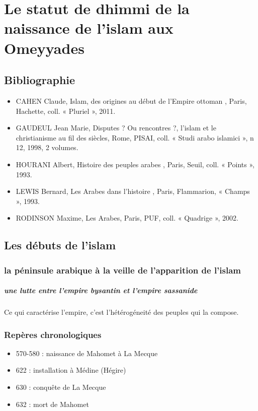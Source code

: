 \chapter{Le statut de dhimmi de la
naissance de l’islam aux Omeyyades}



\section{Bibliographie}

\begin{itemize}
    \item CAHEN Claude,
Islam, des origines au début de l’Empire ottoman , Paris, Hachette, coll. « Pluriel », 2011.
    \item 
GAUDEUL
Jean Marie, Disputes ? Ou rencontres ?, l’islam et le christianisme au fil des siècles, Rome,
PISAI, coll. « Studi arabo islamici », n 12, 1998, 2 volumes.
    \item 
HOURANI Albert,
Histoire des peuples arabes , Paris, Seuil, coll. « Points », 1993.
    \item 
LEWIS Bernard,
Les Arabes dans l’histoire , Paris, Flammarion, « Champs », 1993.
    \item 
RODINSON Maxime,
Les Arabes, Paris, PUF, coll. « Quadrige », 2002.
\end{itemize}


\section{Les débuts de l’islam}

\subsection{la péninsule arabique à la veille de l'apparition de l'islam}

\paragraph{une lutte entre l'empire bysantin et l'empire sassanide}
\begin{Def}[Empire]
Ce qui caractérise l'empire, c'est l'hétérogéneité des peuples qui la compose. 
\end{Def}

 \subsection{Repères chronologiques}
 \begin{itemize}
   \item	570-580 : naissance de Mahomet à La Mecque
\item 	622 : installation à Médine (Hégire)
\item 	630 : conquête de La Mecque
\item 	632 : mort de Mahomet
 \end{itemize}


